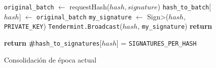   \begin{figure}[t!]
  \begin{adjustbox}{minipage=[t]{\columnwidth}}
    \begin{algorithm}[H]
      \renewcommand{\thealgorithm}{ABCI Haschain - Parte 2}         
      \caption{\small Consolidación de época actual}%
      \label{alg:abci-hash2}%
      \small
      \begin{algorithmic}[1]
            	\label{alg:hash_revert}
                \State \texttt{original\_batch} $\leftarrow$ requestHash($hash, signature$)
					\State \texttt{hash\_to\_batch}[$hash$]  $\leftarrow$ \texttt{original\_batch}     
                			\State \texttt{my\_signature} $\leftarrow$ \<Sign>($hash$, \texttt{PRIVATE\_KEY})
                			\State \texttt{Tendermint.Broadcast}($hash$, \texttt{my\_signature})
					\EndIf   
				\EndIf             	
                	\State \textbf{return}
            \EndFunction
            
             \label{alg:hash_consolidated}
            		\State \textbf{return} \textbf{\#}\texttt{hash\_to\_signatures}[$hash$] = \texttt{SIGNATURES\_PER\_HASH}
            \EndFunction

        \end{algorithmic}
      \end{algorithm}
	\end{adjustbox}
  \end{figure}
  
